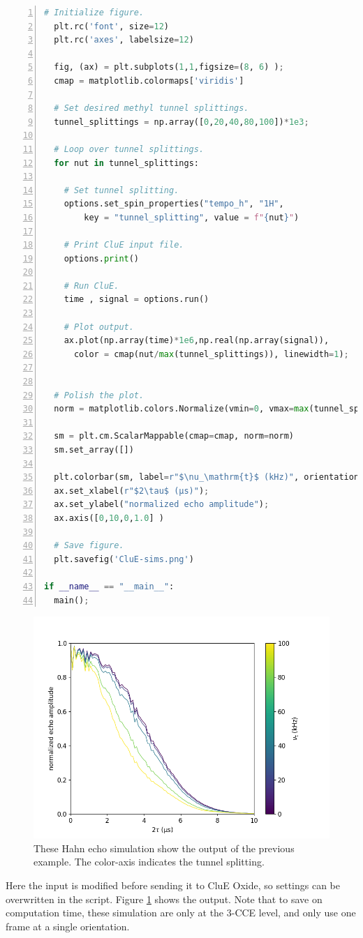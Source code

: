 \documentclass{book}
\begin{document}
\begin{lstlisting}[frame=single,numbers=left,language=python]
  # Initialize figure.
  plt.rc('font', size=12)
  plt.rc('axes', labelsize=12)

  fig, (ax) = plt.subplots(1,1,figsize=(8, 6) );
  cmap = matplotlib.colormaps['viridis']

  # Set desired methyl tunnel splittings. 
  tunnel_splittings = np.array([0,20,40,80,100])*1e3;

  # Loop over tunnel splittings.
  for nut in tunnel_splittings:

    # Set tunnel splitting.
    options.set_spin_properties("tempo_h", "1H",
        key = "tunnel_splitting", value = f"{nut}")

    # Print CluE input file.
    options.print()
   
    # Run CluE.
    time , signal = options.run()

    # Plot output.
    ax.plot(np.array(time)*1e6,np.real(np.array(signal)),
      color = cmap(nut/max(tunnel_splittings)), linewidth=1);


  # Polish the plot.
  norm = matplotlib.colors.Normalize(vmin=0, vmax=max(tunnel_splittings)*1e-3)
  
  sm = plt.cm.ScalarMappable(cmap=cmap, norm=norm)
  sm.set_array([])

  plt.colorbar(sm, label=r"$\nu_\mathrm{t}$ (kHz)", orientation="vertical")  
  ax.set_xlabel(r"$2\tau$ (μs)");
  ax.set_ylabel("normalized echo amplitude");
  ax.axis([0,10,0,1.0] )

  # Save figure.
  plt.savefig('CluE-sims.png')

if __name__ == "__main__":
  main();
\end{lstlisting}
%
\begin{figure} [H]
	\centering
	\includegraphics[width=0.75\linewidth]{figs/fig_pyCluE-sims.png}
  \caption{These Hahn echo simulation show the output of the previous example.
  The color-axis indicates the tunnel splitting.
  }
  \label{fig:pyclue_out}
\end{figure}
%
Here the input is modified before sending it to CluE Oxide, 
so settings can be overwritten in the script.
Figure \ref{fig:pyclue_out} shows the output.  
Note that to save on computation time, these simulation are only at the 3-CCE 
level, and only use one frame at a single orientation.
\end{document}

